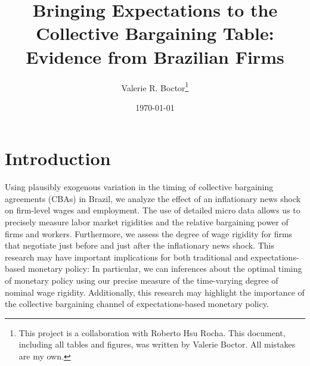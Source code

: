 \documentclass[12pt]{article}
\begin{document}
	\title{Bringing Expectations to the Collective Bargaining Table: Evidence from Brazilian Firms}
	\author{Valerie R. Boctor\thanks{This project is a collaboration with Roberto Hsu Rocha. This document, including all tables and figures, was written by Valerie Boctor. All mistakes are my own. }}
	\date{\today}
	\maketitle

	\section{Introduction}
		Using plausibly exogenous variation in the timing of collective bargaining agreements (CBAs) in Brazil, we analyze the effect of an inflationary news shock on firm-level wages and employment. The use of detailed micro data allows us to precisely measure labor market rigidities and the relative bargaining power of firms and workers. Furthermore, we assess the degree of wage rigidity for firms that negotiate just before and just after the inflationary news shock. This research may have important implications for both traditional and expectations-based monetary policy: In particular, we can inferences about the optimal timing of monetary policy using our precise measure of the time-varying degree of nominal wage rigidity. Additionally, this research may highlight the importance of the collective bargaining channel of expectations-based monetary policy.
	
\end{document}
